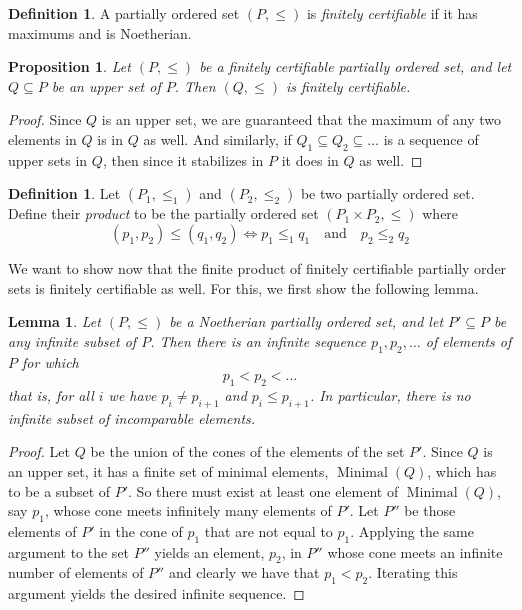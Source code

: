 \documentclass{memo-l}
\theoremstyle{plain}
\theoremstyle{definition}
\numberwithin{section}{chapter}
\numberwithin{equation}{chapter}
\DeclareMathOperator{\Minimal}{Minimal}
\theoremstyle{plain}
\newtheorem{prop}[theorem]{Proposition}
\newtheorem{lem}[theorem]{Lemma}
\theoremstyle{definition}
\newtheorem{defn}[theorem]{Definition}
\begin{document}
\begin{defn} A partially ordered set \( (P,\leq) \) is \emph{finitely
certifiable} if it has maximums and is Noetherian.  \end{defn}

\begin{prop}\label{prop:noether_subset} Let \( (P,\leq) \) be a finitely
certifiable partially ordered set, and let \( Q \subseteq P \) be an upper
set of \(P\). Then \( (Q,\leq) \) is finitely certifiable.  \end{prop}
\begin{proof} Since \( Q \) is an upper set, we are guaranteed that the
maximum of any two elements in \(Q\) is in \(Q\) as well. And similarly, if
\( Q_1 \subseteq Q_2 \subseteq \ldots \) is a sequence of upper sets in
\(Q\), then since it stabilizes in \(P\) it does in \(Q\) as well.
\end{proof}

\begin{defn}\label{defn:poset_product} Let \( (P_1, \leq_1) \) and \( (P_2,
\leq_2) \) be two partially ordered set. Define their \emph{product} to be
the partially ordered set \( (P_1 \times P_2, \leq) \) where \[ (p_1,p_2)
\leq (q_1,q_2) \iff p_1 \leq_1 q_1 
\quad\mbox{and}\quad p_2 \leq_2 q_2 \]
\end{defn}

We want to show now that the finite product of finitely certifiable
partially order sets is finitely certifiable as well. For this, we first
show the following lemma.

\begin{lem}\label{lem:lemma_for_poset_product} Let \( (P,\leq) \) be a
Noetherian partially ordered set, and let \( P' \subseteq P \) be any
infinite subset of \(P\). Then there is an infinite sequence \( p_1, p_2,
\ldots \) of elements of \( P \) for which \[ p_1 < p_2 < \ldots \] that
is, for all \(i\) we have \( p_i \neq p_{i+1} \) and \( p_i \leq p_{i+1}
\). In particular, there is no infinite subset of incomparable elements.
\end{lem} \begin{proof} Let \( Q \) be the union of the cones of the
elements of the set \( P' \). Since \(Q\) is an upper set, it has a finite
set of minimal elements, \( \Minimal(Q) \), which has to be a subset of \(
P' \). So there must exist at least one element of \( \Minimal(Q) \), say
\( p_1 \), whose cone meets infinitely many elements of \( P' \). Let \(
P'' \) be those elements of \( P' \) in the cone of \( p_1 \) that are not
equal to \( p_1\). Applying the same argument to the set \( P'' \) yields
an element, \( p_2 \), in \( P'' \) whose cone meets an infinite number of
elements of \( P'' \) and clearly we have that \( p_1 < p_2 \). Iterating
this argument yields the desired infinite sequence.  \end{proof}
\end{document}

